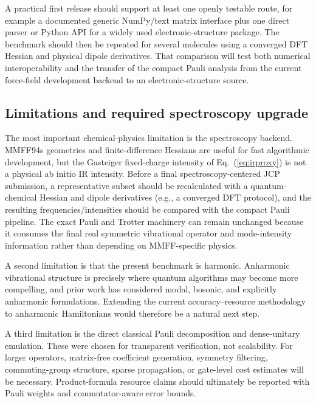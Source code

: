 \documentclass[aip,jcp,reprint,amsmath,amssymb,floatfix]{revtex4-2}
\begin{document}
A practical first release should support at least one openly testable route, for example a documented generic NumPy/text matrix interface plus one direct parser or Python API for a widely used electronic-structure package. The benchmark should then be repeated for several molecules using a converged DFT Hessian and physical dipole derivatives. That comparison will test both numerical interoperability and the transfer of the compact Pauli analysis from the current force-field development backend to an electronic-structure source.

\subsection{Limitations and required spectroscopy upgrade}
\label{sec:limitations}
The most important chemical-physics limitation is the spectroscopy backend. MMFF94s geometries and finite-difference Hessians are useful for fast algorithmic development,\cite{Halgren1996MMFF1} but the Gasteiger fixed-charge intensity of Eq.~(\ref{eq:irproxy}) is not a physical ab initio IR intensity. Before a final spectroscopy-centered JCP submission, a representative subset should be recalculated with a quantum-chemical Hessian and dipole derivatives (e.g., a converged DFT protocol), and the resulting frequencies/intensities should be compared with the compact Pauli pipeline. The exact Pauli and Trotter machinery can remain unchanged because it consumes the final real symmetric vibrational operator and mode-intensity information rather than depending on MMFF-specific physics.

A second limitation is that the present benchmark is harmonic. Anharmonic vibrational structure is precisely where quantum algorithms may become more compelling, and prior work has considered modal, bosonic, and explicitly anharmonic formulations.\cite{Ollitrault2020Hardware,Sawaya2021Vibrational,Trenev2025Resource,Malpathak2026Trotter} Extending the current accuracy--resource methodology to anharmonic Hamiltonians would therefore be a natural next step.

A third limitation is the direct classical Pauli decomposition and dense-unitary emulation. These were chosen for transparent verification, not scalability. For larger operators, matrix-free coefficient generation, symmetry filtering, commuting-group structure, sparse propagation, or gate-level cost estimates will be necessary. Product-formula resource claims should ultimately be reported with Pauli weights and commutator-aware error bounds.\cite{Childs2021Trotter,Trenev2025Resource,Malpathak2026Trotter}
\end{document}
